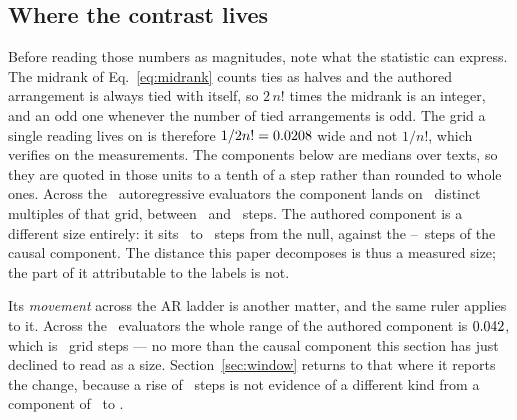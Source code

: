 \subsection{Where the contrast lives}
\label{sec:resolution}

Before reading those numbers as magnitudes, note what the statistic can
express.  The midrank of Eq.~\eqref{eq:midrank} counts ties as halves and
the authored arrangement is always tied with itself, so $2\,n!$ times the
midrank is an integer, and an odd one whenever the number of tied
arrangements is odd.  The grid a single reading lives on is therefore
$1/2n! = 0.0208$ wide and not $1/n!$, which
 verifies on the measurements.  The
components below are medians over texts, so they are quoted in those
units to a tenth of a step rather than rounded to whole ones.
Across the \CausalCompNEval\ autoregressive evaluators the component lands
on \CausalCompNDistinct\ distinct multiples of that grid, between
\CausalCompStepsMin\ and \CausalCompStepsMax\ steps.  The authored component is a different size
entirely: it sits \AuthoredCompStepsMin\ to \AuthoredCompStepsMax\ steps
from the null, against the \CausalCompStepsMin--\CausalCompStepsMax\ steps
of the causal component.  The distance this paper decomposes is thus a
measured size; the part of it attributable to the labels is not.

Its \emph{movement} across the AR ladder is another matter, and the same ruler
applies to it.  Across the \TrendNEval\ evaluators the whole range of the authored
component is $0.042$, which is \AuthoredCompSpanSteps\ grid
steps --- no more than the causal component this section has just declined
to read as a size.  Section~\ref{sec:window} returns to that where
it reports the change, because a rise of \AuthoredCompSpanSteps\ steps is
not evidence of a different kind from a component of
\CausalCompStepsMin\ to \CausalCompStepsMax.

